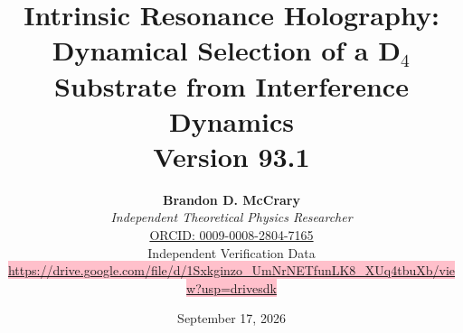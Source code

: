 \documentclass[a4paper,11pt]{article}
\begin{document}
\title{\textbf{\Huge Intrinsic Resonance Holography:}\\[0.8em]
\Large Dynamical Selection of a D$_4$ Substrate from Interference Dynamics\\[0.5em]
\large Version 93.1}
\vspace{1.5cm}
\author{\textbf{Brandon D. McCrary}\\[0.25em]
\textit{Independent Theoretical Physics Researcher}\\[0.5em]
\href{https://orcid.org/0009-0008-2804-7165}{ORCID: 0009-0008-2804-7165}\\[0.5em]
Independent Verification Data\\[0.25em]
{\small\colorbox{pink}{\href{https://drive.google.com/file/d/1Sxkginzo_UmNrNETfunLK8_XUq4tbuXb/view?usp=drivesdk}{https://drive.google.com/file/d/1Sxkginzo\_UmNrNETfunLK8\_XUq4tbuXb/view?usp=drivesdk}}}}

\date{September 17, 2026}

\maketitle
\end{document}

